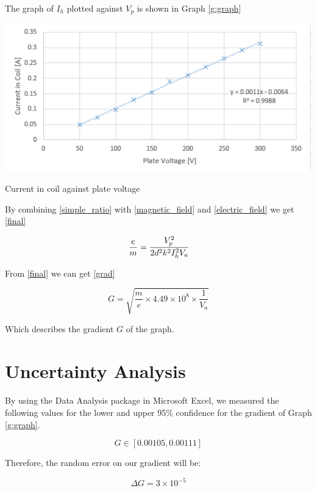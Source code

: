 \documentclass{article}
\begin{document}
The graph of \(I_h\) plotted against \(V_p\) is shown in Graph \ref{g:graph}

\begin{graph}[H]
  \includegraphics[width=\textwidth]{./img/graph.pdf}
  \caption{Current in coil against plate voltage}
  \label{g:graph}
\end{graph}

By combining \eqref{simple_ratio} with \eqref{magnetic_field} and \eqref{electric_field} we get \eqref{final}

\begin{equation}\label{final}
  \frac{e}{m} = \cfrac{V_p^2}{2d^2k^2I_h^2V_a}
\end{equation}

From \eqref{final} we can get \eqref{grad}

\begin{equation}\label{grad}
  G = \sqrt{\frac{m}{e} \times 4.49 \times 10^8 \times \frac{1}{V_a}}
\end{equation}

Which describes the gradient \(G\) of the graph.

\section{Uncertainty Analysis}
\paragraph{}
By using the Data Analysis package in Microsoft Excel, we measured the following values for the lower and upper 95\% confidence for the gradient of Graph \ref{g:graph}.

\[
  G \in [0.00105, 0.00111]
\]

Therefore, the random error on our gradient will be:

\[
  \Delta G = 3 \times 10^{-5}
\]
\end{document}
